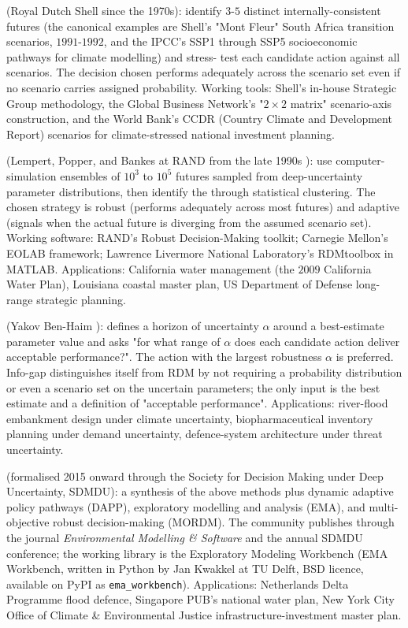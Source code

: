  (Royal Dutch Shell since the 1970s):
identify $3$-$5$ distinct internally-consistent futures (the
canonical examples are Shell's "Mont Fleur" South Africa
transition scenarios, $1991$-$1992$, and the IPCC's SSP1 through
SSP5 socioeconomic pathways for climate modelling) and stress-
test each candidate action against all scenarios. The decision
chosen performs adequately across the scenario set even if no
scenario carries assigned probability. Working tools: Shell's
in-house Strategic Group methodology, the Global Business
Network's "$2 \times 2$ matrix" scenario-axis construction,
and the World Bank's CCDR (Country Climate and Development
Report) scenarios for climate-stressed national investment
planning.

 (Lempert, Popper, and
Bankes at RAND from the late 1990s
\cite{paper:lempert-2003-shaping-future}): use computer-simulation
ensembles of $10^{3}$ to $10^{5}$ futures sampled from
deep-uncertainty parameter distributions, then identify the
through statistical clustering. The chosen strategy is robust
(performs adequately across most futures) and adaptive (signals
when the actual future is diverging from the assumed scenario
set). Working software: RAND's Robust Decision-Making toolkit;
Carnegie Mellon's EOLAB framework; Lawrence Livermore National
Laboratory's RDMtoolbox in MATLAB. Applications: California
water management (the $2009$ California Water Plan), Louisiana
coastal master plan, US Department of Defense long-range
strategic planning.

 (Yakov Ben-Haim
\cite{text:ch09-ben-haim-2006-info-gap}): defines a horizon of
uncertainty $\alpha$ around a best-estimate parameter value and
asks "for what range of $\alpha$ does each candidate action
deliver acceptable performance?". The action with the largest
robustness $\alpha$ is preferred. Info-gap distinguishes itself
from RDM by not requiring a probability distribution or even a
scenario set on the uncertain parameters; the only input is the
best estimate and a definition of "acceptable performance".
Applications: river-flood embankment design under climate
uncertainty, biopharmaceutical inventory planning under
demand uncertainty, defence-system architecture under threat
uncertainty.

 (formalised 2015 onward through the Society for
Decision Making under Deep Uncertainty, SDMDU): a synthesis of
the above methods plus dynamic adaptive policy pathways (DAPP),
exploratory modelling and analysis (EMA), and multi-objective
robust decision-making (MORDM). The community publishes through
the journal \textit{Environmental Modelling \& Software} and the
annual SDMDU conference; the working library is the Exploratory
Modeling Workbench (EMA Workbench, written in Python by Jan
Kwakkel at TU Delft, BSD licence, available on PyPI as
\texttt{ema\_workbench}). Applications: Netherlands Delta
Programme flood defence, Singapore PUB's national water plan,
New York City Office of Climate \& Environmental Justice
infrastructure-investment master plan.


